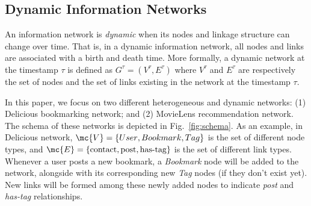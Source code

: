 \subsection{Dynamic Information Networks}
An information network is \emph{dynamic} when its nodes and linkage structure can change over time. That is, in a dynamic information network, all nodes and links are associated with a birth and death time. More formally, a dynamic network at the timestamp $\tau$ is defined as $G^{\tau}=(V^{\tau}, E^{\tau})$ where $V^{\tau}$ and $E^{\tau}$ are respectively the set of nodes and the set of links existing in the network at the timestamp $\tau$.

In this paper, we focus on two different heterogeneous and dynamic networks: (1) Delicious bookmarking network; and (2) MovieLens recommendation network. The schema of these networks is depicted in Fig.~\ref{fig:schema}. As an example, in Delicious network, $\mc{V}=\left\lbrace {User}, {Bookmark}, {Tag}\right\rbrace$ is the set of different node types, and $\mc{E}=\left\lbrace\text{contact}, \text{post}, \text{has-tag}\right\rbrace$ is the set of different link types. Whenever a user posts a new bookmark, a \emph{Bookmark} node will be added to the network, alongside with its corresponding new \emph{Tag} nodes (if they don't exist yet). New links will be formed among these newly added nodes to indicate \textit{post} and \textit{has-tag} relationships.

